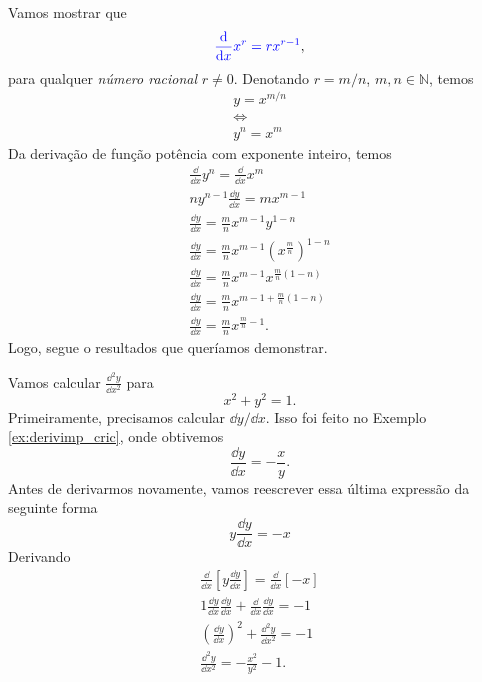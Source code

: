 \begin{obs}
  Vamos mostrar que
  \begin{equation}
    {\color{blue}\frac{\mathrm{d}}{\mathrm{d}x}x^r = rx^{r-1}},
  \end{equation}
  para qualquer \emph{número racional} $r\neq 0$. Denotando $r = m/n$, $m,n\in\mathbb{N}$, temos
  \begin{gather}
    y = x^{m/n}\\
    \Leftrightarrow\\
    y^n = x^m
  \end{gather}
  Da derivação de função potência com exponente inteiro, temos
  \begin{gather}
    \frac{\dd}{\dd x}y^n = \frac{\dd}{\dd x}x^m\\
    ny^{n-1}\frac{\dd y}{\dd x} = mx^{m-1}\\
    \frac{\dd y}{\dd x} = \frac{m}{n}x^{m-1}y^{1-n}\\
    \frac{\dd y}{\dd x} = \frac{m}{n}x^{m-1}\left(x^{\frac{m}{n}}\right)^{1-n}\\
    \frac{\dd y}{\dd x} = \frac{m}{n}x^{m-1}x^{\frac{m}{n}(1-n)}\\
    \frac{\dd y}{\dd x} = \frac{m}{n}x^{m-1 + \frac{m}{n}(1-n)}\\
    \frac{\dd y}{\dd x} = \frac{m}{n}x^{\frac{m}{n}-1}.
  \end{gather}
  Logo, segue o resultados que queríamos demonstrar.
\end{obs}

\begin{ex}
  Vamos calcular $\displaystyle \frac{\dd^2 y}{\dd x^2}$ para
  \begin{equation}
    x^2 + y^2 = 1.
  \end{equation}
  Primeiramente, precisamos calcular $\dd y/\dd x$. Isso foi feito no Exemplo \ref{ex:derivimp_cric}, onde obtivemos
  \begin{equation}
    \frac{\dd y}{\dd x} = -\frac{x}{y}.
  \end{equation}
  Antes de derivarmos novamente, vamos reescrever essa última expressão da seguinte forma
  \begin{equation}
    y\frac{\dd y}{\dd x} = -x
  \end{equation}
  Derivando
  \begin{gather}
    \frac{\dd}{\dd x}\left[y\frac{\dd y}{\dd x}\right] = \frac{\dd}{\dd x}\left[-x\right]\\
    1\frac{\dd y}{\dd x}\frac{\dd y}{\dd x} + \frac{\dd}{\dd x}\frac{\dd y}{\dd x} = -1\\
    \left(\frac{\dd y}{\dd x}\right)^2 + \frac{\dd^2 y}{\dd x^2} = -1\\
    \frac{\dd^2 y}{\dd x^2} = -\frac{x^2}{y^2} - 1.
  \end{gather}
\end{ex}


